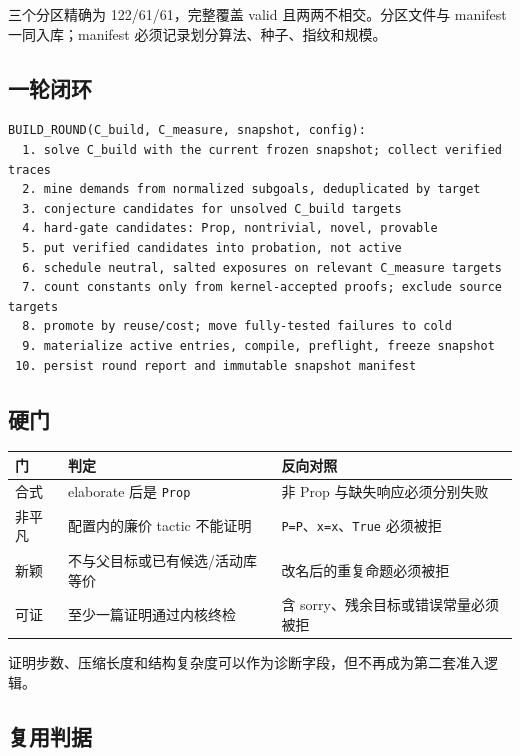 \documentclass[UTF8,a4paper,11pt,fontset=windows]{ctexart}
\newcommand{\code}[1]{\texttt{\small #1}}
\begin{document}
三个分区精确为 122/61/61，完整覆盖 valid 且两两不相交。分区文件与 manifest
一同入库；manifest 必须记录划分算法、种子、指纹和规模。

\subsection{一轮闭环}

\begin{verbatim}
BUILD_ROUND(C_build, C_measure, snapshot, config):
  1. solve C_build with the current frozen snapshot; collect verified traces
  2. mine demands from normalized subgoals, deduplicated by target
  3. conjecture candidates for unsolved C_build targets
  4. hard-gate candidates: Prop, nontrivial, novel, provable
  5. put verified candidates into probation, not active
  6. schedule neutral, salted exposures on relevant C_measure targets
  7. count constants only from kernel-accepted proofs; exclude source targets
  8. promote by reuse/cost; move fully-tested failures to cold
  9. materialize active entries, compile, preflight, freeze snapshot
 10. persist round report and immutable snapshot manifest
\end{verbatim}

\subsection{硬门}

\begin{table}[htbp]
\centering
\small
\begin{tabularx}{\textwidth}{@{}p{2.0cm}p{3.2cm}Y@{}}
\toprule
\textbf{门} & \textbf{判定} & \textbf{反向对照} \\
\midrule
合式 & elaborate 后是 \code{Prop} & 非 Prop 与缺失响应必须分别失败 \\
非平凡 & 配置内的廉价 tactic 不能证明 & \code{P=P}、\code{x=x}、\code{True} 必须被拒 \\
新颖 & 不与父目标或已有候选/活动库等价 & 改名后的重复命题必须被拒 \\
可证 & 至少一篇证明通过内核终检 & 含 sorry、残余目标或错误常量必须被拒 \\
\bottomrule
\end{tabularx}
\end{table}

证明步数、压缩长度和结构复杂度可以作为诊断字段，但不再成为第二套准入逻辑。

\subsection{复用判据}
\end{document}
